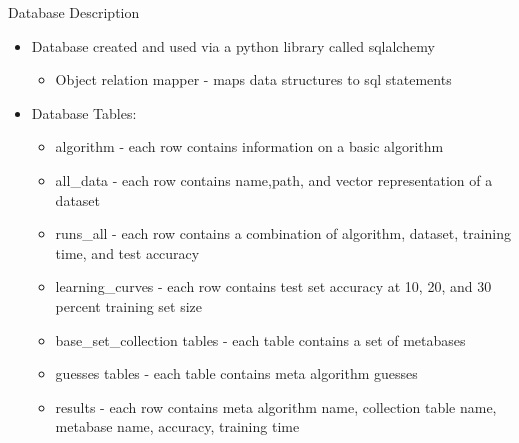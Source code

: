\documentclass{beamer}
\begin{document}
\begin{frame}{Database Description}
  \begin{itemize}
  \item Database created and used via a python library called sqlalchemy
    \begin{itemize}
      \item Object relation mapper - maps data structures to sql statements
    \end{itemize}
  \item Database Tables:
    \begin{itemize}
        \item algorithm - each row contains information on a basic algorithm
        \item all\_data - each row contains name,path, and vector
          representation of a dataset
        \item runs\_all - each row contains a combination of algorithm, dataset,
          training time, and test accuracy
        \item learning\_curves - each row contains test set accuracy at 10, 20,
          and 30 percent training set size
        \item base\_set\_collection tables - each table contains a set of
          metabases
        \item guesses tables - each table contains meta algorithm guesses
        \item results - each row contains meta algorithm name, collection table
          name, metabase name, accuracy, training time
    \end{itemize}
  \end{itemize}
\end{frame}
\end{document}
